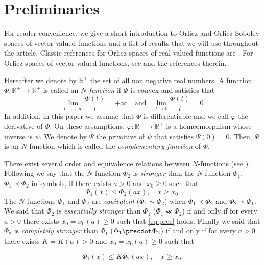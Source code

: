 \documentclass[twoside]{article}
\theoremstyle{remark}
\renewcommand{\leq}{\leqslant}
\renewcommand{\geq}{\geqslant}
\begin{document}
\section{Preliminaries}\label{preliminares}

For reader convenience, we give a short introduction to Orlicz and Orlicz-Sobolev spaces of vector valued functions and a  list  of results that we will use throughout the article. 
Classic references for Orlicz spaces of real valued functions are \cite{adams_sobolev,KR,rao1991theory}.
For  Orlicz spaces of vector valued functions, see \cite{Orliczvectorial2005} and the references therein.

Hereafter we denote  by $\mathbb{R}^+$  the set of all non negative real numbers. A function $\Phi:\mathbb{R}^+\to \mathbb{R}^+ $ is called an \emph{$N$-function} if $\Phi$ is convex and satisfies that
\[
\lim_{t\to+\infty}\frac{\Phi(t)}{t}=+\infty\quad\text{and}\quad \lim_{t\to 0}\frac{\Phi(t)}{t}=0
\]
In addition,  in this paper  we assume that $\Phi$ is differentiable and we call $\varphi$  the derivative of $\Phi$. 
On these assumptions, $\varphi:\mathbb{R}^+\rightarrow \mathbb{R}^+$ is a homeomorphism whose inverse is $\psi$. 
We denote by $\Psi$ the primitive of $\psi$ that satisfies $\Psi(0)=0$. Then, $\Psi$ is an $N$-function which  is called the \emph{complementary function} of $\Phi$.


There exist several order and equivalence relations between $N$-functions (see \cite[Sec. 2.2]{rao1991theory}).
Following \cite[Def. 1, p. 15-16]{rao1991theory} we say that the   $N$-function $\Phi_2$ is \emph{stronger} than the $N$-function  $\Phi_1$,   $\Phi_1\prec\Phi_2$ in symbols, if  there exists $a>0$ and $x_0\geq 0$ such that
\begin{equation}\label{eq:prec}\Phi_1(x)\leq \Phi_2(ax), \quad x\geq x_0.\end{equation}
 The $N$-functions  $\Phi_1$ and   $\Phi_2$ are \emph{equivalent} ($\Phi_1\sim\Phi_2$)  when  $\Phi_1\prec\Phi_2$ and $\Phi_2\prec\Phi_1$.
We said that  $\Phi_2$ is \emph{essentially stronger} than  $\Phi_1$  ($\Phi_1\llcurly\Phi_2$) if and only if for every $a>0$ there exists $x_0=x_0(a)\geq 0$ such that \eqref{eq:prec} holds. Finally we said that  $\Phi_2$ is \emph{completely stronger} than  $\Phi_1$  ($\Phi_1\precdot\Phi_2$) if and only if for every $a>0$ there exists $K=K(a)>0$ and  $x_0=x_0(a)\geq 0$ such that


\begin{equation}\label{eq:prec2}\Phi_1(x)\leq K\Phi_2(ax), \quad x\geq x_0.\end{equation}
\end{document}
